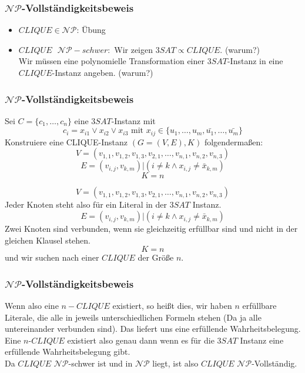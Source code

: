 \documentclass{beamer}
\begin{document}
\begin{frame}
\frametitle{$\mathcal{NP}$-Vollständigkeitsbeweis}
\begin{itemize}
 \item $CLIQUE \in \mathcal{NP}$: Übung\\
 \item $CLIQUE\mbox{ } \mathcal{NP}-schwer:$ Wir zeigen $3SAT \propto CLIQUE$. (warum?)\\\pause
 Wir müssen eine polynomielle Transformation einer $3SAT$-Instanz in eine $CLIQUE$-Instanz angeben. (warum?)\\
\end{itemize}
\end{frame}

\begin{frame}
\frametitle{$\mathcal{NP}$-Vollständigkeitsbeweis}
Sei $C = \{c_1, \ldots, c_n\}$ eine $3SAT$-Instanz mit 
$$ c_i = x_{i1} \vee x_{i2} \vee x_{i3} \mbox{ mit } x_{ij} \in \{u_1,\ldots,u_m,\bar{u_1},\ldots,\bar{u_m}\} $$
Konstruiere eine CLIQUE-Instanz $(G = (V, E), K)$ folgendermaßen:
$$V = (v_{1,1}, v_{1,2}, v_{1,3}, v_{2,1},\ldots,v_{n,1},v_{n,2},v_{n,3})$$
$$E = {(v_{i,j},v_{k,m})| (i \neq k \wedge x_{i,j} \neq \bar{x}_{k,m} )}$$%
$$K = n$$
\end{frame}

\begin{frame}
$$V = (v_{1,1}, v_{1,2}, v_{1,3}, v_{2,1},\ldots,v_{n,1},v_{n,2},v_{n,3})$$
Jeder Knoten steht also für ein Literal in der $3SAT$ Instanz. 
$$E = {(v_{i,j},v_{k,m})| (i \neq k \wedge x_{i,j} \neq \bar{x}_{k,m} )}$$%
Zwei Knoten sind verbunden, wenn sie gleichzeitig erfüllbar sind und nicht in der gleichen Klausel stehen. 
$$K = n$$
und wir suchen nach einer $CLIQUE$ der Größe $n$.\\
\end{frame}
\begin{frame}
\frametitle{$\mathcal{NP}$-Vollständigkeitsbeweis}
Wenn also eine $n-CLIQUE$ existiert, so heißt dies, wir haben $n$ erfüllbare Literale, die alle in jeweils unterschiedlichen Formeln stehen (Da ja alle untereinander verbunden sind). Das liefert uns eine erfüllende Wahrheitsbelegung. Eine $n$-$CLIQUE$ existiert also genau dann wenn es für die $3SAT$ Instanz eine erfüllende Wahrheitsbelegung gibt.\\
Da $CLIQUE$ $\mathcal{NP}$-schwer ist und in $\mathcal{NP}$ liegt, ist also $CLIQUE$ $\mathcal{NP}$-Vollständig.
\end{frame}
\end{document}
